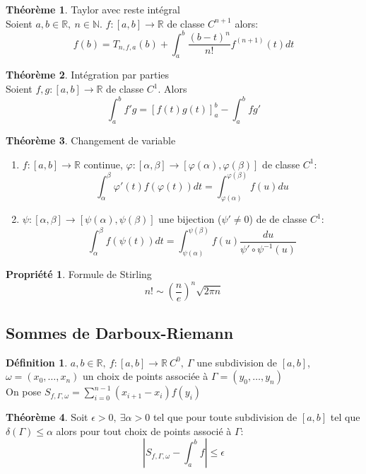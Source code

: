 \documentclass[fleqn]{article}
\theoremstyle{definition} \newtheorem*{defi}{D\'efinition}
\theoremstyle{definition} \newtheorem*{theo}{Th\'eor\`eme}
\theoremstyle{definition} \newtheorem*{coro}{Corollaire}
\theoremstyle{remark} \newtheorem*{rqs}{Remarques}
\theoremstyle{definition} \newtheorem*{prop}{Propri\'et\'e}
\begin{document}
\begin{theo} Taylor avec reste int\'egral \\
	Soient $a,b \in \mathbb{R},\ n \in \mathbb{N}$. $f:[a,b] \rightarrow \mathbb{R}$ de classe $C^{n+1}$ alors:
	\[f(b) = T_{n,f,a}(b) + \int_a^b \frac{(b-t)^n}{n!} f^{(n+1)} (t)dt\]
\end{theo}

\begin{theo} Int\'egration par parties \\
	Soient $f,g: [a,b] \rightarrow \mathbb{R}$ de classe $C^1$. Alors
	\[\int_a^b f'g = [f(t)g(t)]_a^b - \int_a^b fg'\]
\end{theo}

\begin{theo} Changement de variable
	\begin{enumerate}
		\item $f:[a,b] \rightarrow \mathbb{R}$ continue, $\varphi:[\alpha, \beta] \rightarrow [\varphi(\alpha), \varphi(\beta)]$ de classe $C^1$:
			\[\int_\alpha^\beta \varphi '(t) f(\varphi(t)) dt = \int_{\varphi(\alpha)}^{\varphi(\beta)} f(u)du\]
		\item $\psi:[\alpha, \beta] \rightarrow [\psi(\alpha), \psi(\beta)]$ une bijection ($\psi ' \neq 0$) de de classe $C^1$:
			\[\int_\alpha^\beta f(\psi(t)) dt = \int_{\psi(\alpha)}^{\psi(\beta)} f(u)\frac{du}{\psi' \circ \psi^{-1} (u)}\]
	\end{enumerate}
\end{theo}

\begin{prop} Formule de Stirling
	\[n! \sim (\frac{n}{e})^n \sqrt{2\pi n}\]
\end{prop}

\subsection{Sommes de Darboux-Riemann}
\begin{defi}
	$a,b \in \mathbb{R},\ f:[a,b] \rightarrow \mathbb{R}\ C^0,\ \Gamma$ une subdivision de $[a,b]$, $\omega = (x_0, \hdots, x_n)$ un choix de
	points associ\'ee \`a $\Gamma = (y_0, \hdots, y_n)$ \\
	On pose $S_{f,\Gamma, \omega} = \sum_{i=0}^{n-1} (x_{i+1} - x_i) f(y_i)$
\end{defi}
\begin{theo}
	Soit $\epsilon > 0,\ \exists \alpha > 0$ tel que pour toute subdivision de $[a,b]$ tel que $\delta(\Gamma) \leq \alpha$ alors
	pour tout choix de points associ\'e \`a $\Gamma$:
	\[|S_{f,\Gamma, \omega} - \int_a^b f| \leq \epsilon\]
\end{theo}
\end{document}
